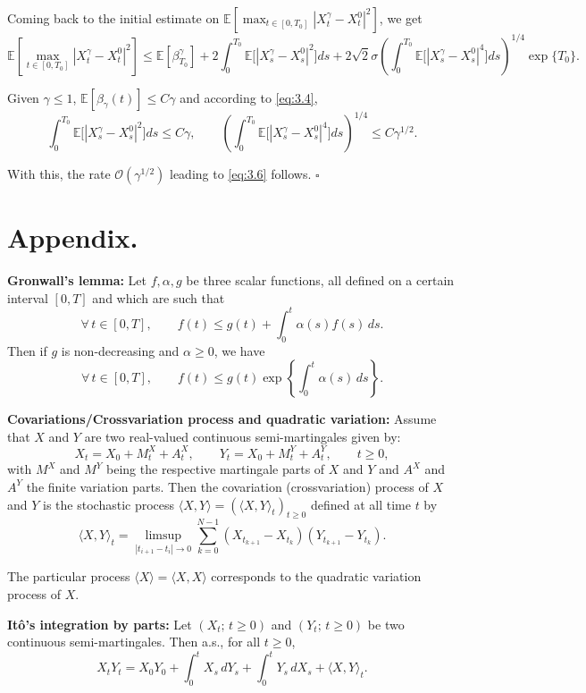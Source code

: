 \documentclass[11pt]{article}
\theoremstyle{remark}
\begin{document}
Coming back to the initial estimate on $\mathbb{E}[\max_{t\in[0,T_0]}|X_t^{\gamma}-X_t^0|^2]$, we get
\[
\mathbb{E}\left[\max_{t\in[0,T_0]}|X_t^{\gamma}-X_t^0|^2\right]
\le \mathbb{E}[\beta_{T_0}^{\gamma}]
+2\int_0^{T_0}\mathbb{E}\bigl[|X_s^{\gamma}-X_s^0|^2\bigr]ds
+2\sqrt{2}\sigma\left(\int_0^{T_0}\mathbb{E}\bigl[|X_s^{\gamma}-X_s^0|^4\bigr]ds\right)^{1/4}\exp\{T_0\}.
\]

Given $\gamma\le1$, $\mathbb{E}[\beta_{\gamma}(t)]\le C\gamma$ and according to \eqref{eq:3.4},
\[
\int_0^{T_0}\mathbb{E}\bigl[|X_s^{\gamma}-X_s^0|^2\bigr]ds\le C\gamma,
\qquad
\left(\int_0^{T_0}\mathbb{E}\bigl[|X_s^{\gamma}-X_s^0|^4\bigr]ds\right)^{1/4}\le C\gamma^{1/2}.
\]

With this, the rate $\mathcal{O}(\gamma^{1/2})$ leading to \eqref{eq:3.6} follows. \hfill $\square$


\section{Appendix.}

\noindent\textbf{Gronwall's lemma:}
Let $f,\alpha,g$ be three scalar functions, all defined on a certain interval $[0,T]$ and which are such that
\[
\forall\, t\in[0,T], \qquad f(t)\le g(t)+\int_0^t \alpha(s)f(s)\,ds.
\]
Then if $g$ is non-decreasing and $\alpha\ge0$, we have
\[
\forall\, t\in[0,T], \qquad f(t)\le g(t)\exp\left\{\int_0^t \alpha(s)\,ds\right\}.
\]

\noindent\textbf{Covariations/Crossvariation process and quadratic variation:}
Assume that $X$ and $Y$ are two real-valued continuous semi-martingales given by:
\[
X_t=X_0+M_t^X+A_t^X,\qquad Y_t=X_0+M_t^Y+A_t^Y,\qquad t\ge0,
\]
with $M^X$ and $M^Y$ being the respective martingale parts of $X$ and $Y$ and $A^X$ and $A^Y$ the finite variation parts.
Then the covariation (crossvariation) process of $X$ and $Y$ is the stochastic process $\langle X,Y\rangle=(\langle X,Y\rangle_t)_{t\ge0}$ defined at all time $t$ by
\[
\langle X,Y\rangle_t=\limsup_{|t_{i+1}-t_i|\to0}\sum_{k=0}^{N-1}(X_{t_{k+1}}-X_{t_k})(Y_{t_{k+1}}-Y_{t_k}).
\]

The particular process $\langle X\rangle=\langle X,X\rangle$ corresponds to the quadratic variation process of $X$.

\noindent\textbf{It\^o's integration by parts:}
Let $(X_t;\,t\ge0)$ and $(Y_t;\,t\ge0)$ be two continuous semi-martingales. Then a.s., for all $t\ge0$,
\[
X_tY_t=X_0Y_0+\int_0^t X_s\,dY_s+\int_0^t Y_s\,dX_s+\langle X,Y\rangle_t.
\]
\end{document}
